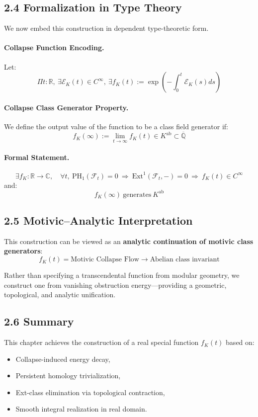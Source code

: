 \documentclass[11pt]{article}
\begin{document}
\subsection*{2.4 Formalization in Type Theory}

We now embed this construction in dependent type-theoretic form.

\paragraph{Collapse Function Encoding.}
Let:
\[
\boxed{
\Pi t : \mathbb{R},\ \exists \mathcal{E}_K(t) \in C^\infty,\ \exists f_K(t) := \exp\left(-\int_0^t \mathcal{E}_K(s)ds\right)
}
\]

\paragraph{Collapse Class Generator Property.}
We define the output value of the function to be a class field generator if:
\[
f_K(\infty) := \lim_{t \to \infty} f_K(t) \in K^{\mathrm{ab}} \subset \overline{\mathbb{Q}}
\]

\paragraph{Formal Statement.}
\[
\exists f_K : \mathbb{R} \to \mathbb{C},\quad \forall t,\ \mathrm{PH}_1(\mathcal{F}_t) = 0\ \Rightarrow\ \mathrm{Ext}^1(\mathcal{F}_t, -) = 0\ \Rightarrow\ f_K(t) \in C^\infty
\]
and:
\[
f_K(\infty)\ \text{generates}\ K^{\mathrm{ab}}
\]

\subsection*{2.5 Motivic–Analytic Interpretation}

This construction can be viewed as an \textbf{analytic continuation of motivic class generators}:
\[
f_K(t) = \text{Motivic Collapse Flow} \longrightarrow \text{Abelian class invariant}
\]

Rather than specifying a transcendental function from modular geometry, we construct one from vanishing obstruction energy—providing a geometric, topological, and analytic unification.

\subsection*{2.6 Summary}

This chapter achieves the construction of a real special function \( f_K(t) \) based on:
\begin{itemize}
    \item Collapse-induced energy decay,
    \item Persistent homology trivialization,
    \item Ext-class elimination via topological contraction,
    \item Smooth integral realization in real domain.
\end{itemize}
\end{document}
